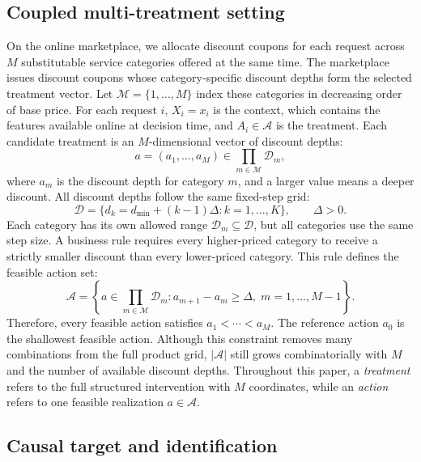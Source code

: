 \documentclass[sigconf,nonacm]{acmart}
\begin{document}
\subsection{Coupled multi-treatment setting}

On the online marketplace, we allocate discount coupons for each request across $M$ substitutable service categories offered at the same time. The marketplace issues discount coupons whose category-specific discount depths form the selected treatment vector. Let $\mathcal M=\{1,\dots,M\}$ index these categories in decreasing order of base price. For each request $i$, $X_i=x_i$ is the context, which contains the features available online at decision time, and $A_i\in\mathcal A$ is the treatment. Each candidate treatment is an $M$-dimensional vector of discount depths:
\begin{equation}
    a=(a_1,\dots,a_M)\in\prod_{m\in\mathcal M}\mathcal D_m,
\end{equation}
where $a_m$ is the discount depth for category $m$, and a larger value means a deeper discount. All discount depths follow the same fixed-step grid:
\begin{equation}
    \mathcal D=\{d_k=d_{\min}+(k-1)\Delta:k=1,\dots,K\},
    \qquad \Delta>0.
\end{equation}
Each category has its own allowed range $\mathcal D_m\subseteq\mathcal D$, but all categories use the same step size. A business rule requires every higher-priced category to receive a strictly smaller discount than every lower-priced category. This rule defines the feasible action set:
\begin{equation}
    \mathcal A=
    \left\{a\in\prod_{m\in\mathcal M}\mathcal D_m:
    a_{m+1}-a_m\ge\Delta,\;m=1,\dots,M-1\right\}.
\end{equation}
Therefore, every feasible action satisfies $a_1<\cdots<a_M$. The reference action $a_0$ is the shallowest feasible action. Although this constraint removes many combinations from the full product grid, $|\mathcal A|$ still grows combinatorially with $M$ and the number of available discount depths. Throughout this paper, a \emph{treatment} refers to the full structured intervention with $M$ coordinates, while an \emph{action} refers to one feasible realization $a\in\mathcal A$.

\subsection{Causal target and identification}
\end{document}

